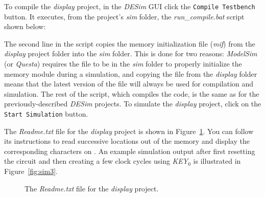 {\clearpage
\newpage
\noindent
To compile the {\it display} project, in the {\it DESim} GUI click the \texttt{Compile Testbench}
button. It executes, from the project's {\it sim} folder, the {\it run\_compile.bat} script
shown below: 



The second line in the script copies the memory initialization file ({\it mif})
from the {\it display} project folder into the {\it sim}
folder. This is done for two reasons: {\it ModelSim} (or {\it Questa}) requires the file 
to be in the {\it sim} folder to properly initialize the memory module during a simulation, 
and copying the file from the {\it display} folder means that the latest version of the file 
will always be used for compilation and simulation. The rest of the script, which compiles the 
\fi code, is the same as for the previously-described 
{\it DESim} projects. To simulate the {\it display} project, click on 
the \texttt{Start Simulation} button.

The {\it Readme.txt} file for the {\it display} project is shown in Figure~\ref{fig:readme2}.
You can follow its instructions to read successive locations out of the memory and
display the corresponding characters on . An example simulation output after
first resetting the circuit and then creating a few clock cycles using {\it KEY}$_0$
is illustrated in Figure~\ref{fig:sim3}.

\lstset{language=make,escapechar=|}
\begin{figure}[h]
\begin{center}
\begin{minipage}[t]{15 cm}
	
\end{minipage}
    \caption{The {\it Readme.txt} file for the {\it display} project.}
\label{fig:readme2}
\end{center}
\end{figure}

}
